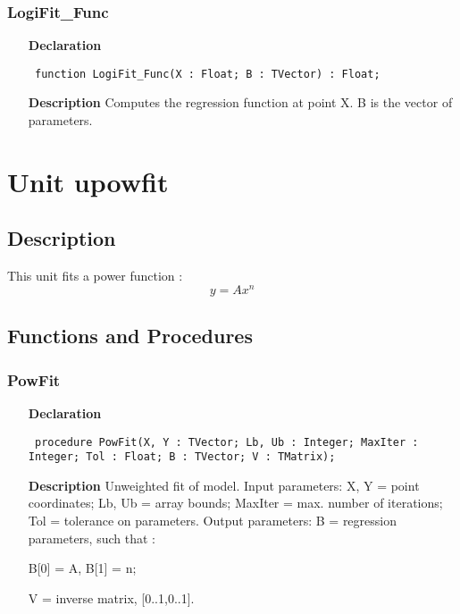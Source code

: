 \documentclass[12pt,a4paper,oneside]{report}
\newcommand{\declarationitem}[1]{\textbf{#1}}
\newcommand{\descriptiontitle}[1]{\textbf{#1}}
\newcommand{\code}[1]{\texttt{#1}}
\begin{document}
\subsubsection{LogiFit{\_}Func}
\label{ulogifit-LogiFit_Func}
\begin{itemize}\item[\declarationitem{Declaration}\hfill]
	\begin{flushleft}
		\code{
			function LogiFit{\_}Func(X : Float; B : TVector) : Float;}
		
	\end{flushleft}
	
	\par
	\item[\descriptiontitle{Description}]
	Computes the regression function at point X. B is the vector of parameters.
	
\end{itemize}

\section{Unit upowfit}
\label{upowfit}
\subsection{Description}
This unit fits a power function :
$$
y = A x^n
$$

\subsection{Functions and Procedures}
\subsubsection{PowFit}
\label{upowfit-PowFit}
\begin{itemize}\item[\declarationitem{Declaration}\hfill]
	\begin{flushleft}
		\code{
			procedure PowFit(X, Y : TVector; Lb, Ub : Integer; MaxIter : Integer; Tol : Float; B : TVector; V : TMatrix);}
		
	\end{flushleft}
	
	\par
	\item[\descriptiontitle{Description}]
	Unweighted fit of model. Input parameters: X, Y = point coordinates; Lb, Ub = array bounds; MaxIter = max. number of iterations; Tol = tolerance on parameters. Output parameters: B = regression parameters, such that :
	
	B[0] = A, B[1] = n; 
	
	V = inverse matrix, [0..1,0..1].
	
\end{itemize}
\end{document}
